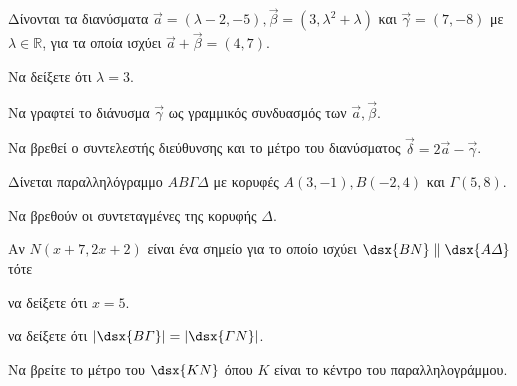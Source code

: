 \documentclass[twoside,nofonts,ektypwsh]{frontisthrio-diag}
\begin{document}
\begin{thema}
\begin{erwthma}
\end{erwthma}
\item Δίνονται τα διανύσματα $ \vec{a}=(\lambda-2,-5),\vec{\beta}=(3,\lambda^2+\lambda) $ και $ \vec{\gamma}=(7,-8) $ με $ \lambda\in\mathbb{R} $, για τα οποία ισχύει $ \vec{a}+\vec{\beta}=(4,7) $.
\begin{erwthma}
\item Να δείξετε ότι $ \lambda=3 $.
\item Να γραφτεί το διάνυσμα $ \vec{\gamma} $ ως γραμμικός συνδυασμός των $ \vec{a},\vec{\beta} $.
\item Να βρεθεί ο συντελεστής διεύθυνσης και το μέτρο του διανύσματος $ \vec{\delta}=2\vec{a}-\vec{\gamma} $.
\end{erwthma}
\item Δίνεται παραλληλόγραμμο $ AB\varGamma\varDelta $ με κορυφές $ A(3,-1), B(-2,4) $ και $ \varGamma(5,8) $.
\begin{erwthma}
\item Να βρεθούν οι συντεταγμένες της κορυφής $ \varDelta $.
\item Αν $ N(x+7,2x+2) $ είναι ένα σημείο για το οποίο ισχύει $ \dsx{BN}\parallel\dsx{A\varDelta} $ τότε
\begin{alist}
\item να δείξετε ότι $ x=5 $.
\item να δείξετε ότι $ |\dsx{B\varGamma}|=|\dsx{\varGamma N}| $.
\end{alist}
\item Να βρείτε το μέτρο του $ \dsx{KN} $ όπου $ K $ είναι το κέντρο του παραλληλογράμμου.
\end{erwthma}
\end{thema}
\kaliepityxia
{}
\end{document}

